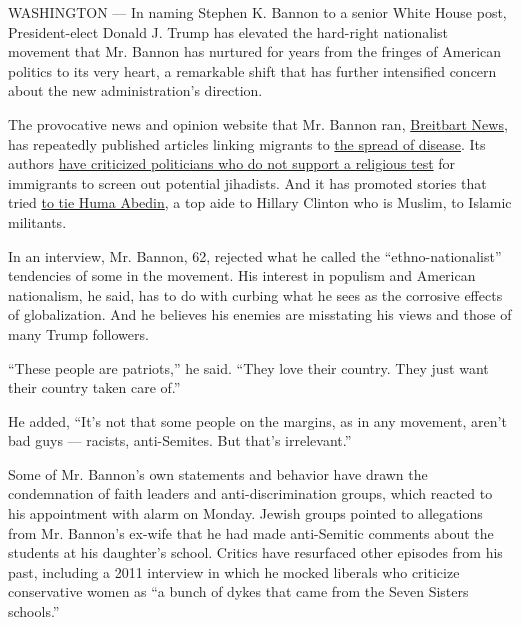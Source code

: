 WASHINGTON --- In naming Stephen K. Bannon to a senior White House post,
President-elect Donald J. Trump has elevated the hard-right nationalist
movement that Mr. Bannon has nurtured for years from the fringes of
American politics to its very heart, a remarkable shift that has further
intensified concern about the new administration's direction.

The provocative news and opinion website that Mr. Bannon ran,
\href{http://www.breitbart.com/}{Breitbart News}, has repeatedly
published articles linking migrants to
\href{http://www.breitbart.com/big-government/2016/06/19/diseases-thought-eradicated-world-refugee-day/}{the
spread of disease}. Its authors
\href{http://www.breitbart.com/2016-presidential-race/2016/05/09/paul-ryan-says-u-s-must-admit-muslim-migrants-sends-kids-to-private-school-that-screens-them-out/}{have
criticized politicians who do not support a religious test} for
immigrants to screen out potential jihadists. And it has promoted
stories that tried
\href{http://www.breitbart.com/radio/2016/09/08/erik-prince-on-huma-abedin-agent-of-influence-very-sympathetic-to-the-muslim-brotherhood-had-hillary-clintons-ear-for-all-these-years/}{to
tie Huma Abedin}, a top aide to Hillary Clinton who is Muslim, to
Islamic militants.

In an interview, Mr. Bannon, 62, rejected what he called the
``ethno-nationalist'' tendencies of some in the movement. His interest
in populism and American nationalism, he said, has to do with curbing
what he sees as the corrosive effects of globalization. And he believes
his enemies are misstating his views and those of many Trump followers.

``These people are patriots,'' he said. ``They love their country. They
just want their country taken care of.''

He added, ``It's not that some people on the margins, as in any
movement, aren't bad guys --- racists, anti-Semites. But that's
irrelevant.''

Some of Mr. Bannon's own statements and behavior have drawn the
condemnation of faith leaders and anti-discrimination groups, which
reacted to his appointment with alarm on Monday. Jewish groups pointed
to allegations from Mr. Bannon's ex-wife that he had made anti-Semitic
comments about the students at his daughter's school. Critics have
resurfaced other episodes from his past, including a 2011 interview in
which he mocked liberals who criticize conservative women as ``a bunch
of dykes that came from the Seven Sisters schools.''

